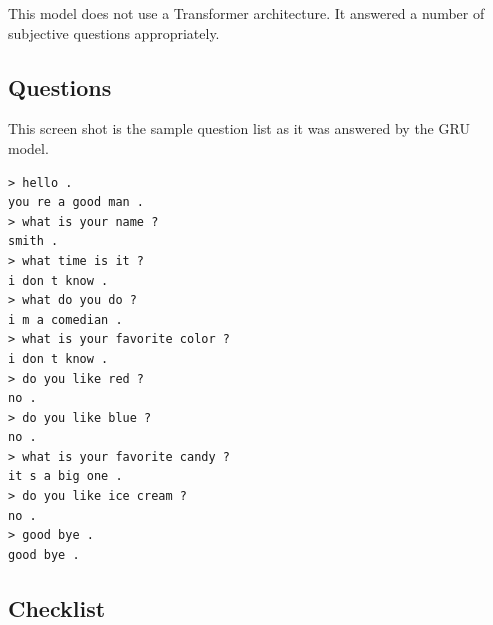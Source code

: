 This model does not use a Transformer architecture. It answered a number of subjective questions appropriately. 

\label{chatbot-gru-tutorial-used}

\subsection{Questions}
This screen shot is the sample question list as it was answered by the GRU model.

\begin{verbatim}
> hello .
you re a good man .
> what is your name ?
smith .
> what time is it ?
i don t know .
> what do you do ?
i m a comedian .
> what is your favorite color ?
i don t know .
> do you like red ?
no .
> do you like blue ?
no .
> what is your favorite candy ?
it s a big one .
> do you like ice cream ?
no .
> good bye .
good bye .
\end{verbatim}


\subsection{Checklist}

